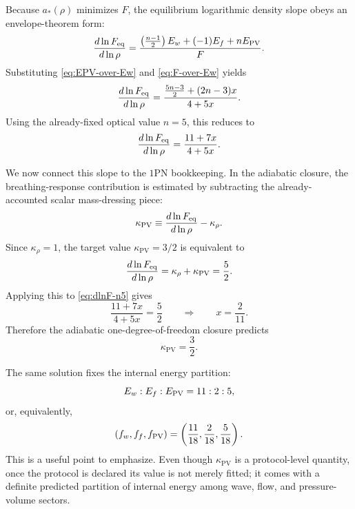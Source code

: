 \documentclass[11pt]{article}
\newcommand{\kPV}{\kappa_{\mathrm{PV}}}
\newcommand{\krho}{\kappa_{\rho}}
\begin{document}
Because \(a_*(\rho)\) minimizes \(F\), the equilibrium logarithmic density slope obeys an
envelope-theorem form:
\begin{equation}
\frac{d\ln F_{\rm eq}}{d\ln \rho}
=
\frac{
\left(\frac{n-1}{2}\right)E_w
+
(-1)E_f
+
nE_{\rm PV}
}{F}.
\label{eq:envelope-slope-general}
\end{equation}
Substituting \eqref{eq:EPV-over-Ew} and \eqref{eq:F-over-Ew} yields
\begin{equation}
\frac{d\ln F_{\rm eq}}{d\ln \rho}
=
\frac{\frac{5n-3}{2} + (2n-3)x}{4+5x}.
\label{eq:envelope-slope-x}
\end{equation}
Using the already-fixed optical value \(n=5\), this reduces to
\begin{equation}
\frac{d\ln F_{\rm eq}}{d\ln \rho}
=
\frac{11+7x}{4+5x}.
\label{eq:dlnF-n5}
\end{equation}

We now connect this slope to the \(1\)PN bookkeeping. In the adiabatic closure, the
breathing-response contribution is estimated by subtracting the already-accounted scalar
mass-dressing piece:
\begin{equation}
\kPV
\equiv
\frac{d\ln F_{\rm eq}}{d\ln \rho}
-
\krho.
\label{eq:kPV-def}
\end{equation}
Since \(\krho=1\), the target value \(\kPV=3/2\) is equivalent to
\begin{equation}
\frac{d\ln F_{\rm eq}}{d\ln \rho}
=
\krho+\kPV
=
\frac52.
\label{eq:dlnF-target}
\end{equation}
Applying this to \eqref{eq:dlnF-n5} gives
\begin{equation}
\frac{11+7x}{4+5x}=\frac52
\qquad\Longrightarrow\qquad
x=\frac{2}{11}.
\label{eq:x-two-elevenths}
\end{equation}
Therefore the adiabatic one-degree-of-freedom closure predicts
\begin{equation}
\boxed{\kPV=\frac32.}
\label{eq:kPV-three-halves}
\end{equation}

The same solution fixes the internal energy partition:
\begin{equation}
E_w:E_f:E_{\rm PV}=11:2:5,
\label{eq:partition-11-2-5}
\end{equation}
or, equivalently,
\begin{equation}
(f_w,f_f,f_{\rm PV})
=
\left(\frac{11}{18},\frac{2}{18},\frac{5}{18}\right).
\label{eq:partition-fractions}
\end{equation}
This is a useful point to emphasize. Even though \(\kPV\) is a protocol-level quantity,
once the protocol is declared its value is not merely fitted; it comes with a definite
predicted partition of internal energy among wave, flow, and pressure-volume sectors.
\end{document}
